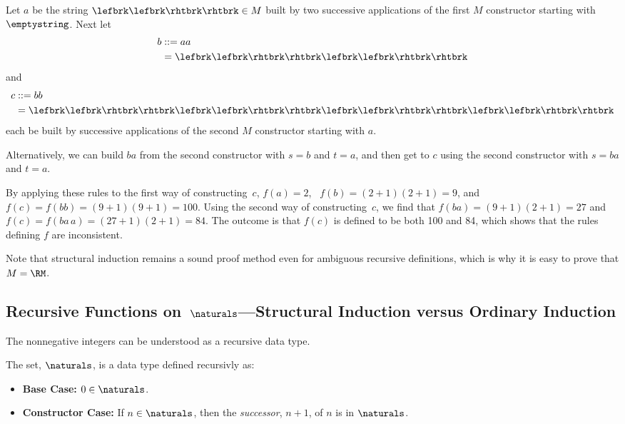 Let $a$ be the string $\lefbrk\lefbrk\rhtbrk\rhtbrk \in M$ built by two successive
applications of the first $M$ constructor starting with $\emptystring$.  Next
let 
\begin{align*}
    b & ::= aa \\
      &   = \lefbrk\lefbrk\rhtbrk\rhtbrk\lefbrk\lefbrk\rhtbrk\rhtbrk
\end{align*}
and
\begin{align*}
    c & ::= bb \\
      &   = \lefbrk\lefbrk\rhtbrk\rhtbrk\lefbrk\lefbrk\rhtbrk\rhtbrk\lefbrk\lefbrk\rhtbrk\rhtbrk\lefbrk\lefbrk\rhtbrk\rhtbrk
\end{align*}
each be built by successive applications
of the second $M$ constructor starting with $a$.

Alternatively, we can build $ba$ from the second constructor with $s=b$
and $t=a$, and then get to $c$ using the second constructor with $s=ba$
and $t=a$.

By applying these rules to the first way of constructing~$c$,
$f(a) = 2$, \ $f(b) = (2+1)(2+1)=9$, and $f(c) = f(bb)=
(9+1)(9+1)=100$.  Using the second way of constructing~$c$, we find
that $f(ba) = (9+1)(2+1) = 27$ and $f(c) = f(ba\,a) = (27 +1)
(2+1) = 84$.
The outcome is that $f(c)$ is defined to be both 100 and 84, which shows
that the rules defining $f$ are inconsistent.

Note that structural induction remains a sound proof method even
for ambiguous recursive definitions, which is why it is easy to prove
that $M=\RM$.

\subsection{Recursive Functions on~$\naturals$---Structural Induction
  versus Ordinary Induction}

The nonnegative integers can be understood as a recursive data type.
\begin{definition}\label{0succ}
The set, $\naturals$, is a data type defined recursivly as:
\begin{itemize}

\item
\textbf{Base Case:} $0 \in \naturals$.

\item
\textbf{Constructor Case:} If $n \in \naturals$, then the
\emph{successor}, $n+1$, of $n$ is in $\naturals$.

\end{itemize}

\end{definition}

